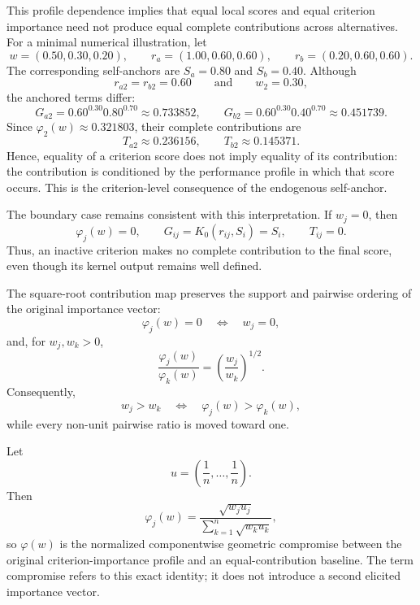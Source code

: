 \documentclass[reqno,11pt]{amsart}
\theoremstyle{definition}
\theoremstyle{plain}
\theoremstyle{remark}
\begin{document}
This profile dependence implies that equal local scores and equal criterion importance need not produce equal complete contributions across alternatives. For a minimal numerical illustration, let
\[
w=(0.50,0.30,0.20),
\qquad
r_a=(1.00,0.60,0.60),
\qquad
r_b=(0.20,0.60,0.60).
\]
The corresponding self-anchors are $S_a=0.80$ and $S_b=0.40$. Although
\[
r_{a2}=r_{b2}=0.60
\qquad\text{and}\qquad
w_2=0.30,
\]
the anchored terms differ:
\[
G_{a2}
=
0.60^{0.30}0.80^{0.70}
\approx
0.733852,
\qquad
G_{b2}
=
0.60^{0.30}0.40^{0.70}
\approx
0.451739.
\]
Since $\varphi_2(w)\approx0.321803$, their complete contributions are
\[
T_{a2}\approx0.236156,
\qquad
T_{b2}\approx0.145371.
\]
Hence, equality of a criterion score does not imply equality of its contribution: the contribution is conditioned by the performance profile in which that score occurs. This is the criterion-level consequence of the endogenous self-anchor.

The boundary case remains consistent with this interpretation. If $w_j=0$, then
\[
\varphi_j(w)=0,
\qquad
G_{ij}=K_0(r_{ij},S_i)=S_i,
\qquad
T_{ij}=0.
\]
Thus, an inactive criterion makes no complete contribution to the final score, even though its kernel output remains well defined.

The square-root contribution map preserves the support and pairwise ordering of the original importance vector:
\begin{equation*}
\varphi_j(w)=0
\quad\Longleftrightarrow\quad
w_j=0,
\end{equation*}
and, for $w_j,w_k>0$,
\begin{equation}
\frac{\varphi_j(w)}{\varphi_k(w)}
=
\left(
\frac{w_j}{w_k}
\right)^{1/2}.
\label{eq:ratio-compression}
\end{equation}
Consequently,
\[
w_j>w_k
\quad\Longleftrightarrow\quad
\varphi_j(w)>\varphi_k(w),
\]
while every non-unit pairwise ratio is moved toward one.

Let
\[
u=\left(\frac1n,\ldots,\frac1n\right).
\]
Then
\begin{equation*}
\varphi_j(w)
=
\frac{\sqrt{w_ju_j}}
{\sum_{k=1}^{n}\sqrt{w_ku_k}},
\end{equation*}
so $\varphi(w)$ is the normalized componentwise geometric compromise between the original criterion-importance profile and an equal-contribution baseline. The term compromise refers to this exact identity; it does not introduce a second elicited importance vector.
\end{document}

